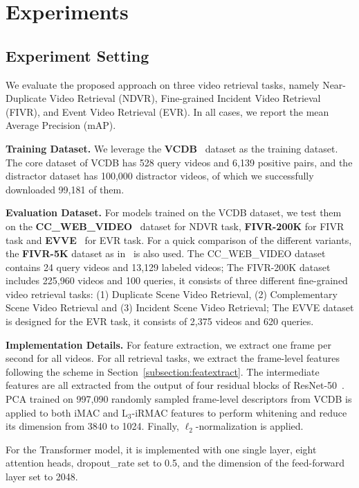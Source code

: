 \documentclass[10pt,twocolumn,letterpaper]{article}
\begin{document}
\section{Experiments} \label{section:experiments}
\subsection{Experiment Setting} \label{subsection:expsetting}
We evaluate the proposed approach on three video retrieval tasks, namely Near-Duplicate Video Retrieval (NDVR), Fine-grained Incident Video Retrieval (FIVR), and Event Video Retrieval (EVR). In all cases, we report the mean Average Precision (mAP).

\textbf{Training Dataset.}
We leverage the \textbf{VCDB}~\cite{jiang2014vcdb} dataset as the training dataset. The core dataset of VCDB has 528 query videos and 6,139 positive pairs, and the distractor dataset has 100,000 distractor videos, of which we successfully downloaded 99,181 of them.

\textbf{Evaluation Dataset.}
For models trained on the VCDB dataset, we test them on the \textbf{CC\_WEB\_VIDEO}~\cite{wu2007practical} dataset for NDVR task, \textbf{FIVR-200K} for FIVR task and \textbf{EVVE}~\cite{revaud2013event} for EVR task. For a quick comparison of the different variants, the \textbf{FIVR-5K} dataset as in~\cite{kordopatis2019visil} is also used. 
The CC\_WEB\_VIDEO dataset contains 24 query videos and 13,129 labeled videos;
The FIVR-200K dataset includes 225,960 videos and 100 queries, it consists of three different fine-grained video retrieval tasks: (1) Duplicate Scene Video Retrieval, (2) Complementary Scene Video Retrieval and (3) Incident Scene Video Retrieval;
The EVVE dataset is designed for the EVR task, it consists of 2,375 videos and 620 queries.

\textbf{Implementation Details.}
For feature extraction, we extract one frame per second for all videos. For all retrieval tasks, we extract the frame-level features following the scheme in Section~\ref{subsection:featextract}. The intermediate features are all extracted from the output of four residual blocks of ResNet-50~\cite{he2016deep}. PCA trained on 997,090 randomly sampled frame-level descriptors from VCDB is applied to both iMAC and $\text{L}_3$-iRMAC features to perform whitening and reduce its dimension from 3840 to 1024. Finally, $\ell_2$-normalization is applied.

For the Transformer model, it is implemented with one single layer, eight attention heads, dropout\_rate set to 0.5, and the dimension of the feed-forward layer set to 2048.
\end{document}
